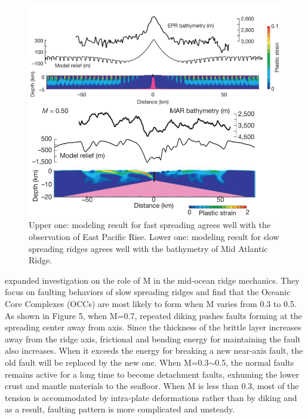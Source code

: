 \documentclass[12pt]{article}
\begin{document}

\begin{figure}[H]
 \centering
  \includegraphics[scale=0.7]{fig5_1.png}
 \caption{\small{Upper one: modeling result for fast spreading agrees well with the observation of East Pacific Rise. Lower one: modeling result for slow spreading ridges agrees well with the bathymetry of Mid Atlantic Ridge. \citep{Buck2005}}}
 \label{fig5_1}
\end{figure}
\citet{Tucholke2008} expanded investigation on the role of M in the mid-ocean ridge mechanics. They focus on faulting behaviors of slow spreading ridges and find that the Oceanic Core Complexes (OCCs) are most likely to form when M varies from 0.3 to 0.5. As shown in Figure 5, when M=0.7, repeated diking pushes faults forming at the spreading center away from axis. Since the thickness of the brittle layer increases away from the ridge axis, frictional and bending energy for maintaining the fault also increases. When it exceeds the energy for breaking a new near-axis fault, the old fault will be replaced by the new one. When M=0.3$\sim$0.5, the normal faults remains active for a long time to become detachment faults, exhuming the lower crust and mantle materials to the seafloor. When M is less than 0.3, most of the tension is accommodated by intra-plate deformations rather than by diking and as a result, faulting pattern is more complicated and unsteady.
\end{document}

